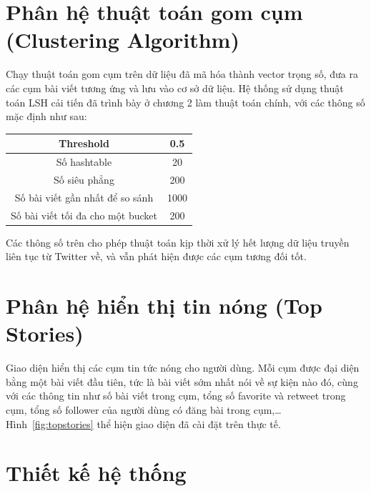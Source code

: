 \section{Phân hệ thuật toán gom cụm (Clustering Algorithm)}
Chạy thuật toán gom cụm trên dữ liệu đã mã hóa thành vector trọng số, đưa ra các cụm bài viết tương ứng và lưu vào cơ sở dữ liệu. Hệ thống sử dụng thuật toán LSH cải tiến đã trình bày ở chương 2 làm thuật toán chính, với các thông số mặc định như sau:
	\begin{table}[H]
		\centering
		\setlength\extrarowheight{3pt}
		\begin{tabular}{|c|c|}
			\hline 
			Threshold & 0.5 \\ 
			\hline 
			Số hashtable & 20 \\ 
			\hline 
			Số siêu phẳng & 200 \\ 
			\hline 
			Số bài viết gần nhất để so sánh & 1000 \\ 
			\hline 
			Số bài viết tối đa cho một bucket & 200 \\ 
			\hline 
		\end{tabular} 
	\end{table}

Các thông số trên cho phép thuật toán kịp thời xử lý hết lượng dữ liệu truyền liên tục từ Twitter về, và vẫn phát hiện được các cụm tương đối tốt.

\section{Phân hệ hiển thị tin nóng (Top Stories)}
Giao diện hiển thị các cụm tin tức nóng cho người dùng. Mỗi cụm được đại diện bằng một bài viết đầu tiên, tức là bài viết sớm nhất nói về sự kiện nào đó, cùng với các thông tin như số bài viết trong cụm, tổng số favorite và retweet trong cụm, tổng số follower của người dùng có đăng bài trong cụm,… Hình~\ref{fig:topstories} thể hiện giao diện đã cài đặt trên thực tế.

\section{Thiết kế hệ thống} 

